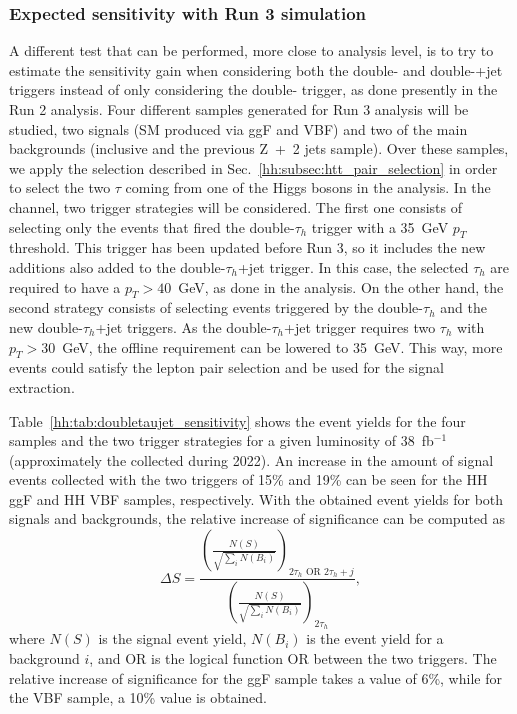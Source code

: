\documentclass[../main.tex]{subfiles}
\begin{document}
%
%

\subsubsection{Expected sensitivity with Run 3 simulation}

A different test that can be performed, more close to analysis level, is to try to estimate the sensitivity gain when considering both the double-\tauh{} and double-\tauh{}+jet triggers instead of only considering the double-\tauh{} trigger, as done presently in the Run 2 \hhbbtt{} analysis. Four different samples generated for Run 3 analysis will be studied, two signals (SM \hhbbtt{} produced via ggF and VBF) and two of the main backgrounds (inclusive \ttbar{} and the previous Z~+~2 jets sample). Over these samples, we apply the selection described in Sec.~\ref{hh:subsec:htt_pair_selection} in order to select the two $\tau$ coming from one of the Higgs bosons in the \hhbbtt{} analysis. In the \tauh\tauh{} channel, two trigger strategies will be considered. The first one consists of selecting only the events that fired the double-$\tau_h$ trigger with a 35~GeV $p_T$ threshold. This trigger has been updated before Run 3, so it includes the new additions also added to the double-$\tau_h$+jet trigger. In this case, the selected $\tau_h$ are required to have a $p_T>40$~GeV, as done in the \hhbbtt analysis. On the other hand, the second strategy consists of selecting events triggered by the double-$\tau_h$ and the new double-$\tau_h$+jet triggers. As the double-$\tau_h$+jet trigger requires two $\tau_h$ with $p_T>30$~GeV, the offline requirement can be lowered to 35~GeV. This way, more events could satisfy the lepton pair selection and be used for the signal extraction.

Table~\ref{hh:tab:doubletaujet_sensitivity} shows the event yields for the four samples and the two trigger strategies for a given luminosity of 38~fb${}^{-1}$ (approximately the collected during 2022). An increase in the amount of signal events collected with the two triggers of 15\% and 19\% can be seen for the HH ggF and HH VBF samples, respectively. With the obtained event yields for both signals and backgrounds, the relative increase of significance can be computed as
\begin{equation}
\Delta S = \frac{\left(\frac{N(S)}{\sqrt{\sum_i N(B_i)}}\right)_{2\tau_h \text{ OR } 2\tau_h+j}}{\left(\frac{N(S)}{\sqrt{\sum_i N(B_i)}}\right)_{2\tau_h}},
\end{equation}
where $N(S)$ is the signal event yield, $N(B_i)$ is the event yield for a background $i$, and OR is the logical function OR between the two triggers. The relative increase of significance for the ggF sample takes a value of 6\%, while for the VBF sample, a 10\% value is obtained.
\end{document}
